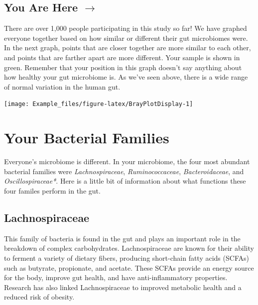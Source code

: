 \documentclass[
]{article}
\begin{document}
\begin{multicols}{2}
\raggedcolumns

\vspace*{\fill}
\section{You Are Here $\boldsymbol{\rightarrow}$}
\begin{small}
There are over 1,000 people participating in this study so far! We have 
graphed everyone together based on how similar or different their gut
microbiomes were. In the next graph, points that are closer together
are more similar to each other, and points that are farther apart are
more different. Your sample is shown in green. Remember that your 
position in this graph doesn't say anything about how healthy your
gut microbiome is. As we've seen above, there is a wide range of 
normal variation in the human gut.
\end{small}

\vspace*{\fill}
\columnbreak

\vspace*{1cm}

\begin{center}\texttt{[image: Example\_files/figure-latex/BrayPlotDisplay-1]} \end{center}

\vspace*{\fill}

\end{multicols}

\newpage

\section{Your Bacterial Families}

Everyone's microbiome is different. In your microbiome, the four most
abundant bacterial families were \textit{Lachnospiraceae},
\textit{Ruminococcaceae}, \textit{Bacteroidaceae}, and
\textit{Oscillospiraceae*}. Here is a little bit of information about
what functions these four familes perform in the gut.

\subsection{Lachnospiraceae}

\begin{small}
This family of bacteria is found in the gut and plays an important role in the 
breakdown of complex carbohydrates. Lachnospiraceae are known for their ability 
to ferment a variety of dietary fibers, producing short-chain fatty acids 
(SCFAs) such as butyrate, propionate, and acetate. These SCFAs provide an energy
source for the body, improve gut health, and have anti-inflammatory properties. 
Research has also linked Lachnospiraceae to improved metabolic health and a 
reduced risk of obesity.
\end{small}
\end{document}
